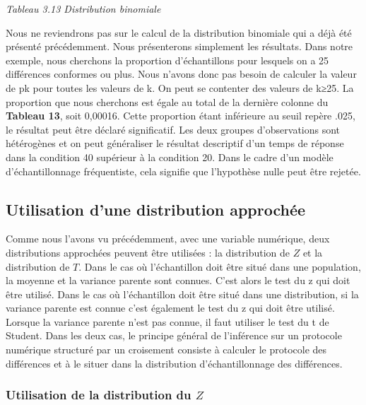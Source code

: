 \documentclass[]{book}
\theoremstyle{definition}
\theoremstyle{definition}
\theoremstyle{definition}
\theoremstyle{remark}
\begin{document}
\emph{Tableau 3.13 Distribution binomiale}

Nous ne reviendrons pas sur le calcul de la distribution binomiale qui a
déjà été présenté précédemment. Nous présenterons simplement les
résultats. Dans notre exemple, nous cherchons la proportion
d'échantillons pour lesquels on a 25 différences conformes ou plus. Nous
n'avons donc pas besoin de calculer la valeur de pk pour toutes les
valeurs de k. On peut se contenter des valeurs de k≥25. La proportion
que nous cherchons est égale au total de la dernière colonne du
\textbf{Tableau 13}, soit 0,00016. Cette proportion étant inférieure au
seuil repère .025, le résultat peut être déclaré significatif. Les deux
groupes d'observations sont hétérogènes et on peut généraliser le
résultat descriptif d'un temps de réponse dans la condition 40 supérieur
à la condition 20. Dans le cadre d'un modèle d'échantillonnage
fréquentiste, cela signifie que l'hypothèse nulle peut être rejetée.

\hypertarget{utilisation-dune-distribution-approchee-3}{%
\subsection{Utilisation d'une distribution
approchée}\label{utilisation-dune-distribution-approchee-3}}

Comme nous l'avons vu précédemment, avec une variable numérique, deux
distributions approchées peuvent être utilisées : la distribution de
\(Z\) et la distribution de \(T\). Dans le cas où l'échantillon doit
être situé dans une population, la moyenne et la variance parente sont
connues. C'est alors le test du z qui doit être utilisé. Dans le cas où
l'échantillon doit être situé dans une distribution, si la variance
parente est connue c'est également le test du z qui doit être utilisé.
Lorsque la variance parente n'est pas connue, il faut utiliser le test
du t de Student. Dans les deux cas, le principe général de l'inférence
sur un protocole numérique structuré par un croisement consiste à
calculer le protocole des différences et à le situer dans la
distribution d'échantillonnage des différences.

\hypertarget{utilisation-de-la-distribution-du-z}{%
\subsubsection{\texorpdfstring{Utilisation de la distribution du
\(Z\)}{Utilisation de la distribution du Z}}\label{utilisation-de-la-distribution-du-z}}
\end{document}
